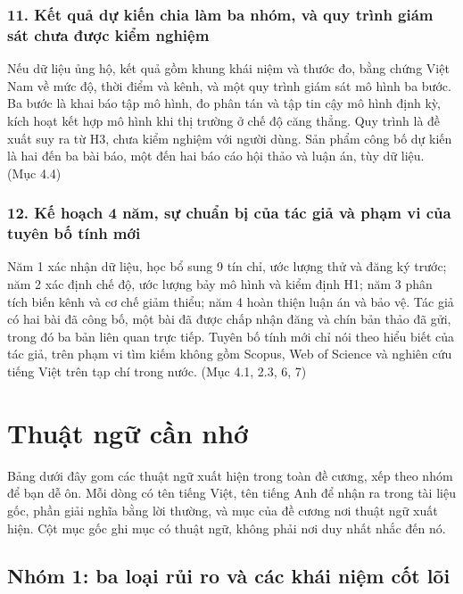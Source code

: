 \subsection{11. Kết quả dự kiến chia làm ba nhóm, và quy trình giám sát chưa được kiểm nghiệm}

Nếu dữ liệu ủng hộ, kết quả gồm khung khái niệm và thước đo, bằng chứng Việt Nam về mức độ, thời điểm và kênh, và một quy trình giám sát mô hình ba bước. Ba bước là khai báo tập mô hình, đo phân tán và tập tin cậy mô hình định kỳ, kích hoạt kết hợp mô hình khi thị trường ở chế độ căng thẳng. Quy trình là đề xuất suy ra từ H3, chưa kiểm nghiệm với người dùng. Sản phẩm công bố dự kiến là hai đến ba bài báo, một đến hai báo cáo hội thảo và luận án, tùy dữ liệu. (Mục 4.4)

\subsection{12. Kế hoạch 4 năm, sự chuẩn bị của tác giả và phạm vi của tuyên bố tính mới}

Năm 1 xác nhận dữ liệu, học bổ sung 9 tín chỉ, ước lượng thử và đăng ký trước; năm 2 xác định chế độ, ước lượng bảy mô hình và kiểm định H1; năm 3 phân tích biến kênh và cơ chế giảm thiểu; năm 4 hoàn thiện luận án và bảo vệ. Tác giả có hai bài đã công bố, một bài đã được chấp nhận đăng và chín bản thảo đã gửi, trong đó ba bản liên quan trực tiếp. Tuyên bố tính mới chỉ nói theo hiểu biết của tác giả, trên phạm vi tìm kiếm không gồm Scopus, Web of Science và nghiên cứu tiếng Việt trên tạp chí trong nước. (Mục 4.1, 2.3, 6, 7)

\chapter{Thuật ngữ cần nhớ}

Bảng dưới đây gom các thuật ngữ xuất hiện trong toàn đề cương, xếp theo nhóm để bạn dễ ôn. Mỗi dòng có tên tiếng Việt, tên tiếng Anh để nhận ra trong tài liệu gốc, phần giải nghĩa bằng lời thường, và mục của đề cương nơi thuật ngữ xuất hiện. Cột mục gốc ghi mục có thuật ngữ, không phải nơi duy nhất nhắc đến nó.

\section{Nhóm 1: ba loại rủi ro và các khái niệm cốt lõi}


